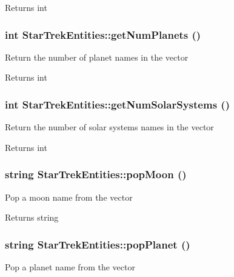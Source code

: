 \begin{DoxyReturn}{Returns}
int 
\end{DoxyReturn}
\hypertarget{classStarTrekEntities_afcb1218c877dba40bc716ea0166f2e59}{
\subsubsection[{getNumPlanets}]{\setlength{\rightskip}{0pt plus 5cm}int StarTrekEntities::getNumPlanets ()}}
\label{d0/ddd/classStarTrekEntities_afcb1218c877dba40bc716ea0166f2e59}
Return the number of planet names in the vector

\begin{DoxyReturn}{Returns}
int 
\end{DoxyReturn}
\hypertarget{classStarTrekEntities_a937db9741fb8f38114688efd88afa9e5}{
\subsubsection[{getNumSolarSystems}]{\setlength{\rightskip}{0pt plus 5cm}int StarTrekEntities::getNumSolarSystems ()}}
\label{d0/ddd/classStarTrekEntities_a937db9741fb8f38114688efd88afa9e5}
Return the number of solar systems names in the vector

\begin{DoxyReturn}{Returns}
int 
\end{DoxyReturn}
\hypertarget{classStarTrekEntities_a66715667564191e7c863422c78b18403}{
\subsubsection[{popMoon}]{\setlength{\rightskip}{0pt plus 5cm}string StarTrekEntities::popMoon ()}}
\label{d0/ddd/classStarTrekEntities_a66715667564191e7c863422c78b18403}
Pop a moon name from the vector

\begin{DoxyReturn}{Returns}
string 
\end{DoxyReturn}
\hypertarget{classStarTrekEntities_ad620c5f963bc9206f7d234f7f7a318aa}{
\subsubsection[{popPlanet}]{\setlength{\rightskip}{0pt plus 5cm}string StarTrekEntities::popPlanet ()}}
\label{d0/ddd/classStarTrekEntities_ad620c5f963bc9206f7d234f7f7a318aa}
Pop a planet name from the vector

